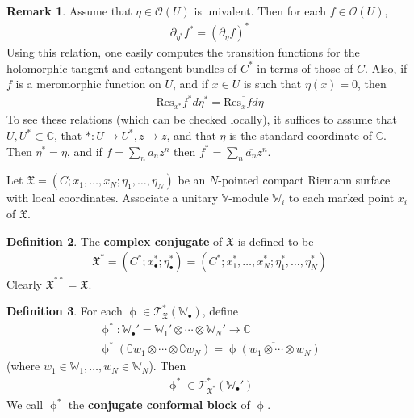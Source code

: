 \documentclass[11pt,b5paper,notitlepage]{article}
\theoremstyle{definition}
\newtheorem{df}{Definition}[section]
\newtheorem{rem}[df]{Remark}
\theoremstyle{plain}
\newcommand{\fk}{\mathfrak}
\newcommand{\ovl}{\overline}
\newcommand{\Res}{\mathrm{Res}}
\newcommand{\scr}{\mathscr}
\newcommand{\Co}{\complement}
\newcommand{\blt}{\bullet}
\newcommand{\Vbb}{\mathbb V}
\newcommand{\Wbb}{\mathbb W}
\newcommand{\Cbb}{\mathbb C}
\numberwithin{equation}{section}
\begin{document}
\begin{rem}
Assume that $\eta\in\scr O(U)$ is univalent. Then for each $f\in\scr O(U)$,
\begin{align}
\partial_{\eta^*}f^*=(\partial_\eta f)^*
\end{align}
Using this relation, one easily computes the transition functions for the holomorphic tangent and cotangent bundles of $C^*$ in terms of those of $C$. Also, if $f$ is a meromorphic function on $U$, and if $x\in U$ is such that $\eta(x)=0$, then
\begin{align}\label{eq22}
\Res_{x^*} f^*d\eta^*=\ovl{\Res_{x}fd\eta} 
\end{align}
To see these relations (which can be checked locally), it suffices to assume that $U,U^*\subset\Cbb$, that $*:U\rightarrow U^*,z\mapsto \ovl z$, and that $\eta$ is the standard coordinate of $\Cbb$. Then $\eta^*=\eta$, and if $f=\sum_n a_nz^n$ then $f^*=\sum_n \ovl{a_n}z^n$.
\end{rem}





Let $\fk X=(C;x_1,\dots,x_N;\eta_1,\dots,\eta_N)$ be an $N$-pointed compact Riemann surface with local coordinates. Associate a unitary $\Vbb$-module $\Wbb_i$ to each marked point $x_i$ of $\fk X$.


\begin{df}\label{lb22}
The \textbf{complex conjugate} of $\fk X$ is defined to be \index{X@$\fk X^*$, the conjugate of $\fk X$}
\begin{align*}
\fk X^*=(C^*;x_\blt^*;\eta_\blt^*)=(C^*;x_1^*,\dots,x_N^*;\eta_1^*,\dots,\eta_N^*)
\end{align*}
Clearly $\fk X^{**}=\fk X$.
\end{df}




\begin{df}\label{lb23}
For each $\upphi\in\scr T_{\fk X}^*(\Wbb_\blt)$, define
\begin{gather*}
\upphi^*:\Wbb_\blt'=\Wbb_1'\otimes\cdots\otimes\Wbb_N'\rightarrow\Cbb\\
\upphi^*(\Co w_1\otimes\cdots\otimes\Co w_N)=\ovl{\upphi(w_1\otimes\cdots\otimes w_N)}
\end{gather*} 
(where $w_1\in\Wbb_1,\dots,w_N\in\Wbb_N$). Then
\begin{align}
\upphi^*\in\scr T_{\fk X^*}^*(\Wbb_\blt')  \label{eq23}
\end{align}
We call $\upphi^*$ the \textbf{conjugate conformal block}  of $\upphi$.
\end{df}
\end{document}
